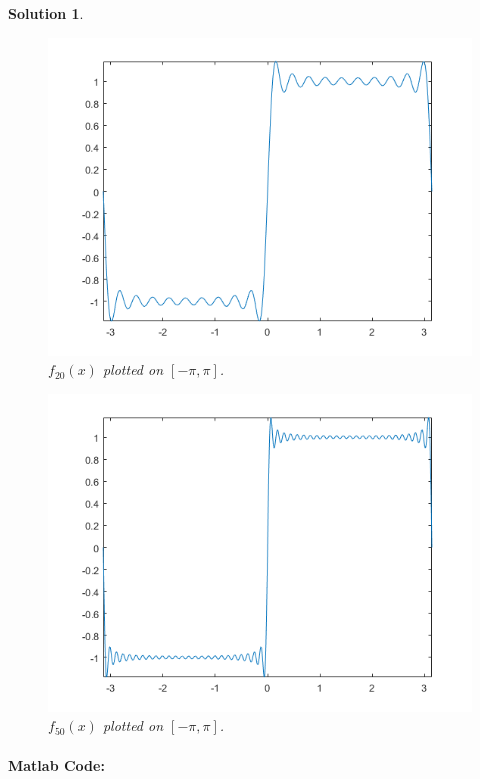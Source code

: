 \documentclass[leqno]{article}
\theoremstyle{nonumberplain}
\newtheorem{solution}{Solution}
\begin{document}
\begin{solution}
\begin{figure}[h!]
    \centering
    \includegraphics{problem_3_12_hw_5.png}
    \caption{$f_{20}(x)$ plotted on $[-\pi,\pi]$.}
    \label{fig:my_label}
\end{figure}
\pagebreak

\begin{figure}[h!]
    \centering
    \includegraphics{problem_3_13_hw_5.png}
    \caption{$f_{50}(x)$ plotted on $[-\pi,\pi]$.}
    \label{fig:my_label}
\end{figure}
\end{solution}

\clearpage
\newpage
\paragraph{Matlab Code:}
\end{document}
